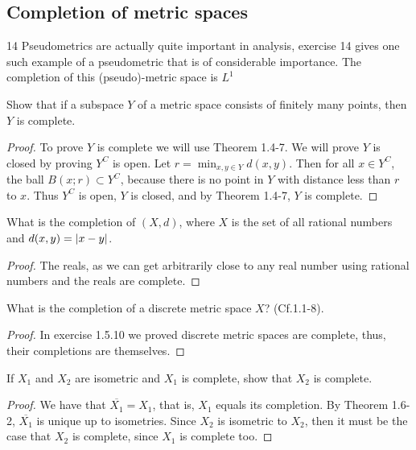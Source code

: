 \subsection{Completion of metric spaces}

14 Pseudometrics are actually quite important in analysis, exercise 14 gives one such example of a pseudometric that is of considerable importance. The completion of this (pseudo)-metric space is $L^1$

\begin{exercise}{1}
Show that if a subspace $Y$ of a metric space consists of finitely many points, then $Y$ is complete.
\end{exercise}
\begin{proof}
To prove $Y$ is complete we will use Theorem 1.4-7. We will prove $Y$ is closed by proving $Y^C$ is open. Let $r=\min_{x,y\in Y}d(x,y)$. Then for all $x\in Y^C$, the ball $B(x;r)\subset Y^C$, because there is no point in $Y$ with distance less than $r$ to $x$. Thus $Y^C$ is open, $Y$ is closed, and by Theorem 1.4-7, $Y$ is complete.
\end{proof}

\begin{exercise}{2}
What is the completion of $(X,d)$, where $X$ is the set of all rational numbers and $d(x,y)=\left\lvert x-y\right\rvert$.
\end{exercise}
\begin{proof}
The reals, as we can get arbitrarily close to any real number using rational numbers and the reals are complete.
\end{proof}

\begin{exercise}{3}
What is the completion of a discrete metric space $X$? (Cf.1.1-8).
\end{exercise}
\begin{proof}
In exercise 1.5.10 we proved discrete metric spaces are complete, thus, their completions are themselves.
\end{proof}

\begin{exercise}{4}
If $X_1$ and $X_2$ are isometric and $X_1$ is complete, show that $X_2$ is complete.
\end{exercise}
\begin{proof}
We have that $\overline{X_1}=X_1$, that is, $X_1$ equals its completion. By Theorem 1.6-2, $\overline{X_1}$ is unique up to isometries. Since $X_2$ is isometric to $X_2$, then it must be the case that $X_2$ is complete, since $X_1$ is complete too.
\end{proof}

